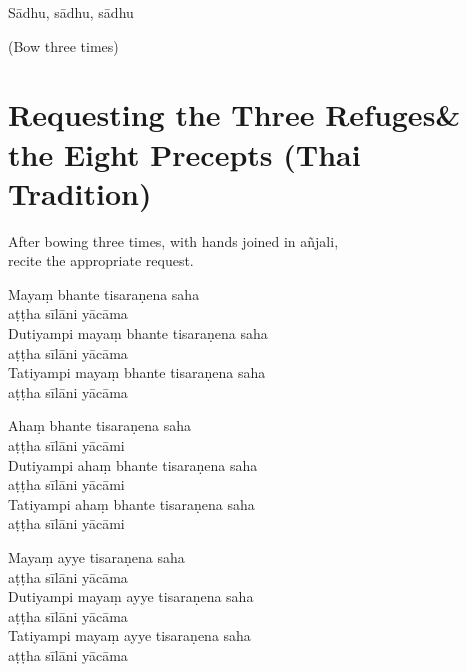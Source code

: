 Sādhu, sādhu, sādhu

\begin{instruction}
  (Bow three times)
\end{instruction}

\clearpage

\section[Three Refuges \& the Eight Precepts]{Requesting the Three Refuges\newline \& the Eight Precepts (Thai Tradition)}

\label{eight-precepts}

\begin{instruction}
  After bowing three times, with hands joined in añjali,\\
  recite the appropriate request.
\end{instruction}

\ifhandbookedition
\enlargethispage{\baselineskip}
\fi


Mayaṃ bhante tisaraṇena saha\\\vin aṭṭha sīlāni yācāma\\
Dutiyampi mayaṃ bhante tisaraṇena saha\\\vin aṭṭha sīlāni yācāma\\
Tatiyampi mayaṃ bhante tisaraṇena saha\\\vin aṭṭha sīlāni yācāma


Ahaṃ bhante tisaraṇena saha\\\vin aṭṭha sīlāni yācāmi\\
Dutiyampi ahaṃ bhante tisaraṇena saha\\\vin aṭṭha sīlāni yācāmi\\
Tatiyampi ahaṃ bhante tisaraṇena saha\\\vin aṭṭha sīlāni yācāmi


Mayaṃ ayye tisaraṇena saha\\\vin aṭṭha sīlāni yācāma\\
Dutiyampi mayaṃ ayye tisaraṇena saha\\\vin aṭṭha sīlāni yācāma\\
Tatiyampi mayaṃ ayye tisaraṇena saha\\\vin aṭṭha sīlāni yācāma

